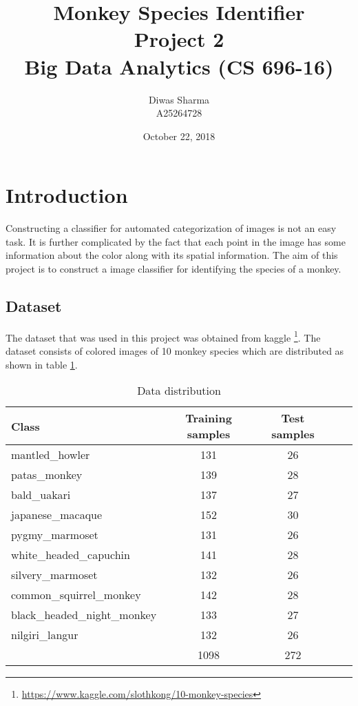 \documentclass[12pt]{article}
\title{Monkey Species Identifier\\ \normalsize Project 2 \\ \small Big Data Analytics (CS 696-16)}
\author{Diwas Sharma \\ A25264728}
\date{October 22, 2018}
\begin{document}
\maketitle
\newpage

\tableofcontents
\newpage

\section{Introduction}
Constructing a classifier for automated categorization of images is not an easy task. It is further complicated by
the fact that each point in the image has some information about the color along with its spatial information. The aim of this
project is to construct a image classifier for identifying the species of a monkey.

\subsection{Dataset}
The dataset that was used in this project was obtained from kaggle \footnote{\url{https://www.kaggle.com/slothkong/10-monkey-species}}.
The dataset consists of colored images of 10 monkey species which are distributed as shown in table \ref{tbl:dataset}. 

\begin{table}[ht]
\centering
\begin{tabular}{ l c c c r }
\hline
Class                        & Training samples & Test samples \\
\hline
mantled\_howler              & 131              & 26 \\
patas\_monkey                & 139              & 28 \\
bald\_uakari                 & 137              & 27 \\
japanese\_macaque            & 152              & 30 \\
pygmy\_marmoset              & 131              & 26 \\
white\_headed\_capuchin      & 141              & 28 \\
silvery\_marmoset            & 132              & 26 \\
common\_squirrel\_monkey     & 142              & 28 \\
black\_headed\_night\_monkey & 133              & 27 \\
nilgiri\_langur              & 132              & 26 \\
\hline
& 1098 & 272 \\
\end{tabular}
\caption{Data distribution}
\label{tbl:dataset}
\end{table}
\end{document}
